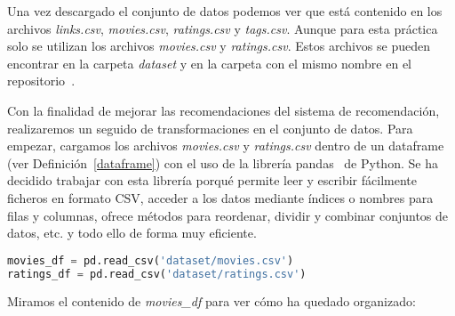 \documentclass{uimppracticas}
\begin{document}
Una vez descargado el conjunto de datos podemos ver que está contenido en los archivos \textit{links.csv}, \textit{movies.csv}, \textit{ratings.csv} y \textit{tags.csv}. Aunque para esta práctica solo se utilizan los archivos \textit{movies.csv} y \textit{ratings.csv}. Estos archivos se pueden encontrar en la carpeta \textit{dataset} y en la carpeta con el mismo nombre en el repositorio~\cite{GitHubRepo}.

Con la finalidad de mejorar las recomendaciones del sistema de recomendación, realizaremos un seguido de transformaciones en el conjunto de datos. Para empezar, cargamos los archivos \textit{movies.csv} y \textit{ratings.csv} dentro de un dataframe (ver Definición~\ref{dataframe}) con el uso de la librería pandas~\cite{pandas} de Python. Se ha decidido trabajar con esta librería porqué permite leer y escribir fácilmente ficheros en formato CSV, acceder a los datos mediante índices o nombres para filas y columnas, ofrece métodos para reordenar, dividir y combinar conjuntos de datos, etc. y todo ello de forma muy eficiente.

\begin{lstlisting}[language=python, basicstyle=\footnotesize, belowskip=-0.5 \baselineskip]
movies_df = pd.read_csv('dataset/movies.csv')
ratings_df = pd.read_csv('dataset/ratings.csv')
\end{lstlisting}

Miramos el contenido de \textit{movies\_df} para ver cómo ha quedado organizado:
\end{document}
